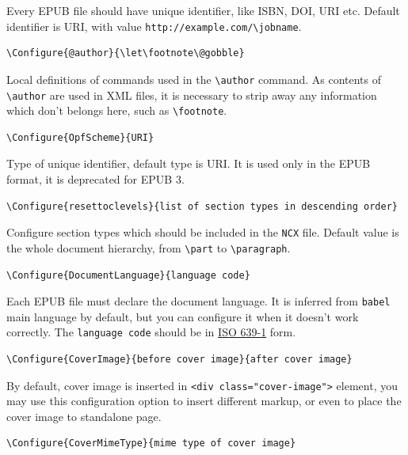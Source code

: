 Every EPUB file should have unique identifier, like ISBN, DOI, URI etc.
Default identifier is URI, with value
\texttt{http://example.com/\textbackslash{}jobname}.

\begin{verbatim}
\Configure{@author}{\let\footnote\@gobble}
\end{verbatim}

Local definitions of commands used in the
\texttt{\textbackslash{}author} command. As contents of
\texttt{\textbackslash{}author} are used in XML files, it is necessary
to strip away any information which don't belongs here, such as
\texttt{\textbackslash{}footnote}.

\begin{verbatim}
\Configure{OpfScheme}{URI}
\end{verbatim}

Type of unique identifier, default type is URI. It is used only in the
EPUB format, it is deprecated for EPUB 3.

\begin{verbatim}
\Configure{resettoclevels}{list of section types in descending order}
\end{verbatim}

Configure section types which should be included in the \texttt{NCX}
file. Default value is the whole document hierarchy, from
\texttt{\textbackslash{}part} to \texttt{\textbackslash{}paragraph}.

\begin{verbatim}
\Configure{DocumentLanguage}{language code}
\end{verbatim}

Each EPUB file must declare the document language. It is inferred from
\texttt{babel} main language by default, but you can configure it when
it doesn't work correctly. The \texttt{language\ code} should be in
\href{https://en.wikipedia.org/wiki/List_of_ISO_639-1_codes}{ISO 639-1}
form.

\begin{verbatim}
\Configure{CoverImage}{before cover image}{after cover image}
\end{verbatim}

By default, cover image is inserted in
\texttt{\textless{}div\ class="cover-image"\textgreater{}} element, you
may use this configuration option to insert different markup, or even to
place the cover image to standalone page.

\begin{verbatim}
\Configure{CoverMimeType}{mime type of cover image}
\end{verbatim}

